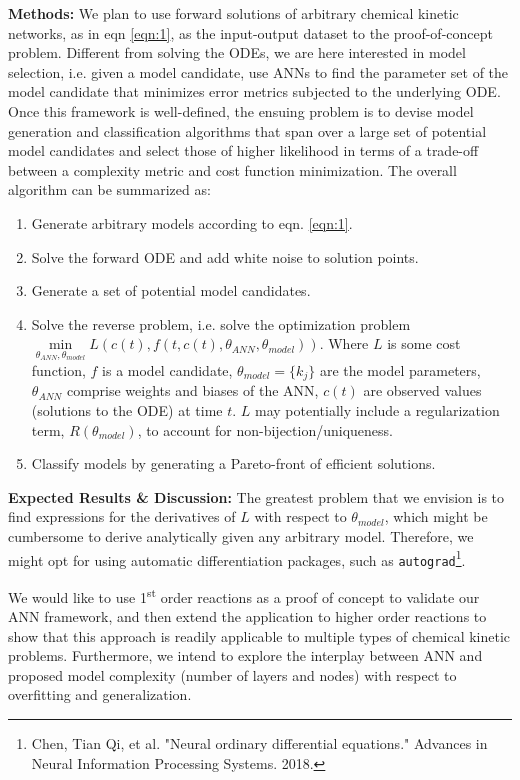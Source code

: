 \documentclass[10pt]{article}
\begin{document}
 \vspace{0.5em}
 
\textbf{Methods: }We plan to use forward solutions of arbitrary chemical kinetic networks, as in eqn \ref{eqn:1}, as the input-output dataset to the proof-of-concept problem. Different from solving the ODEs, we are here interested in model selection, i.e. given a model candidate, use ANNs to find the parameter set of the model candidate that minimizes error metrics subjected to the underlying ODE. Once this framework is well-defined, the ensuing problem is to devise model generation and classification algorithms that span over a large set of potential model candidates and select those of higher likelihood in terms of a trade-off between a complexity metric and cost function minimization. The overall algorithm can be summarized as:
\begin{enumerate}[noitemsep]
    \item Generate arbitrary models according to eqn. \ref{eqn:1}.
    \item Solve the forward ODE and add white noise to solution points.
    \item Generate a set of potential model candidates.
    \item Solve the reverse problem, i.e. solve the optimization problem $\underset{\theta_{ANN},\theta_{model}}{\min} L(c(t),f(t,c(t),\theta_{ANN},\theta_{model}))$. Where $L$ is some cost function, $f$ is a model candidate, $\theta_{model}=\{k_j\}$ are the model parameters, $\theta_{ANN}$ comprise weights and biases of the ANN, $c(t)$ are observed values (solutions to the ODE) at time $t$. $L$ may potentially include a regularization term, $R(\theta_{model})$, to account for non-bijection/uniqueness. 
    \item Classify models by generating a Pareto-front of efficient solutions.
\end{enumerate}
\textbf{Expected Results \& Discussion: }The greatest problem that we envision is to find expressions for the derivatives of $L$ with respect to $\theta_{model}$, which might be cumbersome to derive analytically given any arbitrary model. Therefore, we might opt for using automatic differentiation packages, such as \texttt{autograd}\footnote{Chen, Tian Qi, et al. "Neural ordinary differential equations." Advances in Neural Information Processing Systems. 2018.}. 

\vspace{0.2em}

We would like to use 1\textsuperscript{st} order reactions as a proof of concept to validate our ANN framework, and then extend the application to higher order reactions to show that this approach is readily applicable to multiple types of chemical kinetic problems. Furthermore, we intend to explore the interplay between ANN and proposed model complexity (number of layers and nodes) with respect to overfitting and generalization.
\end{document}

